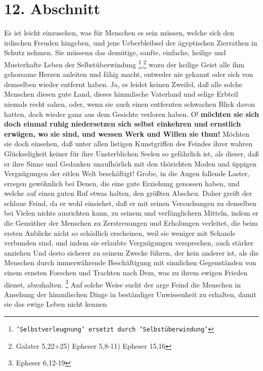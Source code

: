 {\section{12. Abschnitt} \label{kap17_ab12}

Es ist leicht einzusehen, was für Menschen es sein müssen, welche sich den
irdischen Freuden hingeben, und jene Ueberbleibsel der ägyptischen Zierrathen in
Schutz nehmen. Sie müssenn das demütige, sanfte, einfache, heilige und
Musterhafte Leben der Selbstüberwindung
\footnote{\texttt{'Selbstverleugnung' ersetzt durch
'Selbstüberwindung'}},\footnote{Galater 5,22+25) Epheser 5,8-11)
Epheser 15,16}
wozu der heilige Geist alle ihm gehorsame Herzen anleiten und fähig
macht, entweder nie gekannt oder sich von demselben wieder entfernt haben. Ja,
es leidet keinen Zweifel, daß alle solche Menschen diesen gute Land, dieses
himmlische Vaterland und selige Erbteil niemals recht sahen, oder, wenn sie auch
einen entfernten schwachen Blick davon hatten, doch wieder ganz aus dem Gesichte
verloren haben. O! \textbf{möchten sie sich doch einmal ruhig niedersetzen sich
selbst
einkehren und ernstlich erwägen, wo sie sind, und wessen Werk und Willen sie
thun!} Möchten sie doch einsehen, daß unter allen listigen Kunstgriffen des
Feindes ihrer wahren Glückseligkeit keiner für ihre Unsterblichen Seelen so
gefährlich ist, als dieser, daß er ihre Sinne und Gedanken unaufhörlich mit den
thörichten Moden und üppigen Vergnügungen der eitlen Welt beschäftigt! Grobe, in
die Augen fallende Laster, erregen gewöhnlich bei Denen, die eine gute Erziehung
genossen haben, und welche auf einen guten Ruf etwas halten, den größten
Abscheu. Daher greift der schlaue Feind, da er wohl einsiehet, daß er mit seinen
Versuchungen zu denselben bei Vielen nichts ausrichten kann, zu seinem und
verfänglichern Mitteln, indem er die Gemüther der Menschen zu Zerstreuungen und
Erholungen verleitet, die beim ersten Anblicke nicht so schädlich erscheinen,
weil sie weniger mit Schande verbunden sind, und indem sie erlaubte Vergnügungen
versprechen, auch stärker anziehen Und desto sicherer zu seinem Zwecke führen,
der kein anderer ist, als die Menschen durch immerwährende Beschäftigung mit
sinnlichen Gegenständen von einem ernsten Forschen und Trachten nach Dem, was zu
ihrem ewigen Frieden dienet, abzuhalten.
\footnote{Epheser 6,12-19}
Anf solche
Weise sucht der arge Feind die Menschen in Ansehung der himmlischen Dinge in
beständiger Unwissenheit zu erhalten, damit sie das ewige Leben nicht kennen
}
